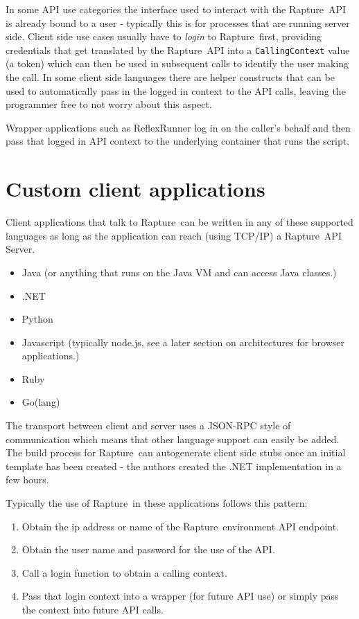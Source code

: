 \documentclass[12pt,twoside,a4paper]{book}
\newcommand{\Rapture}{Rapture~}
\begin{document}
In some API use categories the interface used to interact with the \Rapture API
is already bound to a user - typically this is for processes that are running
server side. Client side use cases usually have to \emph{login} to \Rapture first,
providing credentials that get translated by the \Rapture API into a \verb+CallingContext+
value (a token) which can then be used in subsequent calls to identify the user
making the call. In some client side languages there are helper constructs that
can be used to automatically pass in the logged in context to the API calls,
leaving the programmer free to not worry about this aspect.

Wrapper applications such as ReflexRunner log in on the caller's behalf and then
pass that logged in API context to the underlying container that runs the script.

\section{Custom client applications}

Client applications that talk to \Rapture can be written in any of these supported languages as
long as the application can reach (using TCP/IP) a \Rapture API Server.

\begin{itemize}
  \item{Java (or anything that runs on the Java VM and can access Java classes.)}
  \item{.NET}
  \item{Python}
  \item{Javascript (typically node.js, see a later section on architectures for browser applications.)}
  \item{Ruby}
  \item{Go(lang)}
\end{itemize}

The transport between client and server uses a JSON-RPC style of communication which
means that other language support can easily be added. The build process for
\Rapture can autogenerate client side stubs once an initial template has been
created - the authors created the .NET implementation in a few hours.

Typically the use of \Rapture in these applications follows this pattern:

\begin{enumerate}
  \item{Obtain the ip address or name of the \Rapture environment API endpoint.}
  \item{Obtain the user name and password for the use of the API.}
  \item{Call a login function to obtain a calling context.}
  \item{Pass that login context into a wrapper (for future API use) or simply pass the context into future API calls.}
\end{enumerate}
\end{document}
